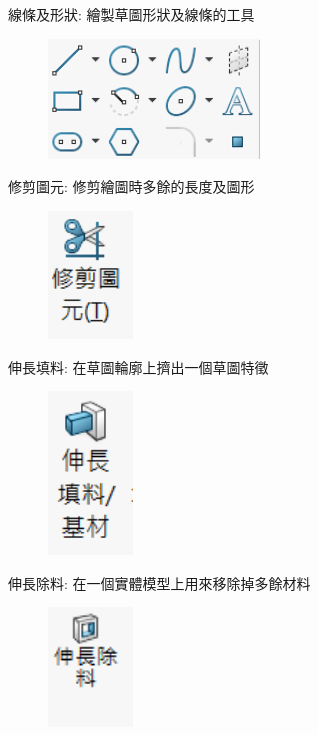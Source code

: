 \noindent 線條及形狀: 繪製草圖形狀及線條的工具

\begin{figure}[h!]
    \centering
    \includegraphics[width=0.5\textwidth]{./../images/6-1-5.png}
\end{figure}

\noindent 修剪圖元: 修剪繪圖時多餘的長度及圖形

\begin{figure}[h!]
    \centering
    \includegraphics[width=0.2\textwidth]{./../images/6-1-6.png}
\end{figure}

\noindent 伸長填料: 在草圖輪廓上擠出一個草圖特徵

\begin{figure}[h!]
    \centering
    \includegraphics[width=0.2\textwidth]{./../images/6-1-7.png}
\end{figure}

\noindent 伸長除料: 在一個實體模型上用來移除掉多餘材料

\begin{figure}[h!]
    \centering
    \includegraphics[width=0.2\textwidth]{./../images/6-1-8.png}
\end{figure}

